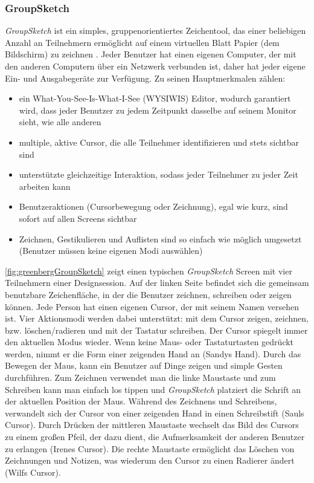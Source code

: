 \subsubsection{GroupSketch} 
\emph{GroupSketch} ist ein simples, gruppenorientiertes Zeichentool, das einer beliebigen Anzahl an Teilnehmern ermöglicht auf einem virtuellen Blatt Papier (dem Bildschirm) zu zeichnen \citep{Greenberg:1991}. Jeder Benutzer hat einen eigenen Computer, der mit den anderen Computern über ein Netzwerk verbunden ist, daher hat jeder eigene Ein- und Ausgabegeräte zur Verfügung. Zu seinen Hauptmerkmalen zählen:
\begin{itemize}
	\item{ein What-You-See-Is-What-I-See (WYSIWIS) Editor, wodurch garantiert wird, dass jeder Benutzer zu jedem Zeitpunkt dasselbe auf seinem Monitor sieht, wie alle anderen}
	\item{multiple, aktive Cursor, die alle Teilnehmer identifizieren und stets sichtbar sind}
	\item{unterstützte gleichzeitige Interaktion, sodass jeder Teilnehmer zu jeder Zeit arbeiten kann}
	\item{Benutzeraktionen (Cursorbewegung oder Zeichnung), egal wie kurz, sind sofort auf allen Screens sichtbar}
	\item{Zeichnen, Gestikulieren und Auflisten sind so einfach wie möglich umgesetzt (Benutzer müssen keine eigenen Modi auswählen)}
\end{itemize}

\autoref{fig:greenbergGroupSketch} zeigt einen typischen \emph{GroupSketch} Screen mit vier Teilnehmern einer Designsession. Auf der linken Seite befindet sich die gemeinsam benutzbare Zeichenfläche, in der die Benutzer zeichnen, schreiben oder zeigen können. Jede Person hat einen eigenen Cursor, der mit seinem Namen versehen ist. 
Vier Aktionsmodi werden dabei unterstützt: mit dem Cursor zeigen, zeichnen, bzw. löschen/radieren und mit der Tastatur schreiben. Der Cursor spiegelt immer den aktuellen Modus wieder. Wenn keine Maus- oder Tastaturtasten gedrückt werden, nimmt er die Form einer zeigenden Hand an (Sandys Hand). Durch das Bewegen der Maus, kann ein Benutzer auf Dinge zeigen und simple Gesten durchführen. Zum Zeichnen verwendet man die linke Maustaste und zum Schreiben kann man einfach los tippen und \emph{GroupSketch} platziert die Schrift an der aktuellen Position der Maus. Während des Zeichnens und Schreibens, verwandelt sich der Cursor von einer zeigenden Hand in einen Schreibstift (Sauls Cursor). Durch Drücken der mittleren Maustaste wechselt das Bild des Cursors zu einem großen Pfeil, der dazu dient, die Aufmerksamkeit der anderen Benutzer zu erlangen (Irenes Cursor). Die rechte Maustaste ermöglicht das Löschen von Zeichnungen und Notizen, was wiederum den Cursor zu einen Radierer ändert (Wilfs Cursor).

